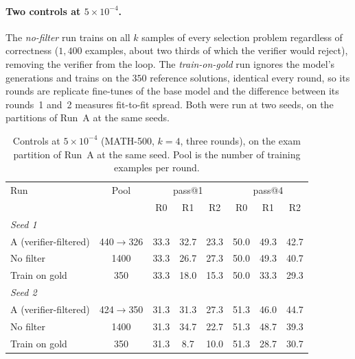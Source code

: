 \documentclass[runningheads]{llncs}
\begin{document}
\paragraph{Two controls at $5\times10^{-4}$.}
The \emph{no-filter} run trains on all $k$ samples of every selection problem
regardless of correctness ($1{,}400$ examples, about two thirds of which the
verifier would reject), removing the verifier from the loop. The
\emph{train-on-gold} run ignores the model's generations and trains on the $350$
reference solutions, identical every round, so its rounds are replicate
fine-tunes of the base model and the difference between its rounds~1 and~2
measures fit-to-fit spread. Both were run at two seeds, on the partitions of Run~A
at the same seeds.

\begin{table}[t]
\caption{Controls at $5\times10^{-4}$ (MATH-500, $k=4$, three rounds), on the
exam partition of Run~A at the same seed. Pool is the number of training examples
per round.}
\label{tab:controls}
\centering
\setlength{\tabcolsep}{5pt}
\begin{tabular}{lccccccc}
\toprule
Run & Pool & \multicolumn{3}{c}{pass@1} & \multicolumn{3}{c}{pass@4} \\
 &  & R0 & R1 & R2 & R0 & R1 & R2 \\
\midrule
\multicolumn{8}{l}{\emph{Seed 1}} \\
A (verifier-filtered) & 440$\to$326 & 33.3 & 32.7 & 23.3 & 50.0 & 49.3 & 42.7 \\
No filter             & 1400 & 33.3 & 26.7 & 27.3 & 50.0 & 49.3 & 40.7 \\
Train on gold         & 350  & 33.3 & 18.0 & 15.3 & 50.0 & 33.3 & 29.3 \\
\midrule
\multicolumn{8}{l}{\emph{Seed 2}} \\
A (verifier-filtered) & 424$\to$350 & 31.3 & 31.3 & 27.3 & 51.3 & 46.0 & 44.7 \\
No filter             & 1400 & 31.3 & 34.7 & 22.7 & 51.3 & 48.7 & 39.3 \\
Train on gold         & 350  & 31.3 & 8.7 & 10.0 & 51.3 & 28.7 & 30.7 \\
\bottomrule
\end{tabular}
\end{table}
\end{document}
